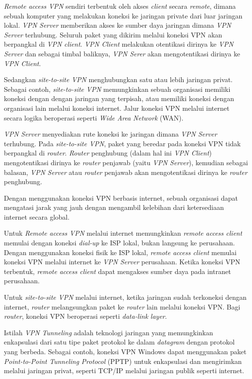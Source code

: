 \documentclass[pdftex,12pt, oneside]{article}
\begin{document}
\begin{enumerate}
\begin{enumerate}
  \textit{Remote access VPN} sendiri terbentuk oleh akses \textit{client} secara \textit{remote}, dimana sebuah komputer yang melakukan koneksi ke jaringan private dari luar jaringan lokal. \textit{VPN Server} memberikan akses ke sumber daya jaringan dimana \textit{VPN Server} terhubung. Seluruh paket yang dikirim melalui koneksi VPN akan berpangkal di \textit{VPN client}. \textit{VPN Client} melakukan otentikasi dirinya ke \textit{VPN Server} dan sebagai timbal baliknya, \textit{VPN Serer} akan mengotentikasi dirinya ke \textit{VPN Client}.
  
  Sedangkan \textit{site-to-site VPN} menghubungkan satu atau lebih jaringan privat. Sebagai contoh, \textit{site-to-site VPN} memungkinkan sebuah organisasi memiliki koneksi dengan dengan jaringan yang terpisah, atau memiliki koneksi dengan organisasi lain melalui koneksi internet. Jalur koneksi VPN melalui internet secara logika beroperasi seperti \textit{Wide Area Network} (WAN).
  
  \textit{VPN Server} menyediakan rute koneksi ke jaringan dimana \textit{VPN Server} terhubung. Pada \textit{site-to-site VPN}, paket yang beredar pada koneksi VPN tidak berpangkal di \textit{router}. \textit{Router} penghubung (dalam hal ini \textit{VPN Client}) mengotentikasi dirinya ke \textit{router} penjawab (yaitu \textit{VPN Server}), kemudian sebagai balasan, \textit{VPN Server} atau \textit{router} penjawab akan mengotentikasi dirinya ke \textit{router} penghubung.
  
  Dengan menggunakan koneksi VPN berbasis internet, sebuah organisasi dapat mengatasi jarak yang jauh dengan mengambil kelebihan dari ketersediaan internet secara global.
  
  Untuk \textit{Remote access VPN} melalui internet memungkinkan \textit{remote access client} memulai dengan koneksi \textit{dial-up} ke ISP lokal, bukan langsung ke perusahaan. Dengan menggunakan koneksi fisik ke ISP lokal, \textit{remote access client} memulai koneksi VPN melalui internet ke \textit{VPN Server} perusahaan. Ketika koneksi VPN terbentuk, \textit{remote access client} dapat mengakses sumber daya pada intranet perusahaan.
  
  Untuk \textit{site-to-site VPN} melalui internet, ketika jaringan sudah terkoneksi dengan internet, \textit{router} melangsungkan paket ke \textit{router} lain melalui koneksi VPN. Bagi \textit{router}, koneksi VPN beroperasi seperti \textit{data-link layer}.
  
  Istilah \textit{VPN Tunneling} adalah teknologi jaringan yang memungkinkan enkapsulasi dari satu tipe paket protokol ke dalam \textit{datagram} dengan protokol yang berbeda. Sebagai contoh, koneksi VPN Windows dapat menggunakan paket \textit{Point-to-Point Tunneling Protocol} (PPTP) untuk enkapsulasi dan mengirimkan melalui jaringan privat, seperti TCP/IP melalui jaringan publik seperti internet.
  

\end{enumerate}
\end{enumerate}
\end{document}
